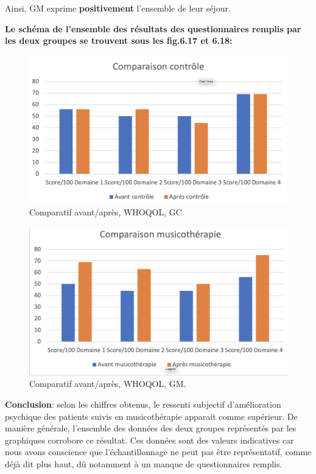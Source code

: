                  Ainsi,  GM exprime
                 \textbf{positivement }
                 l'ensemble de leur séjour.

               \textbf{ Le schéma de l'ensemble des résultats des
                 questionnaires remplis par les deux groupes se trouvent sous les fig.6.17 et 6.18:}
                
\begin{figure}
\centering
\includegraphics[width=0.7\linewidth]{images/Compcontrole.png}
\caption[Schéma du déroulement]{Comparatif avant/après, 
  WHOQOL, GC}
       
\label{groupecontroleimage1}
\end{figure}

\begin{figure}
\centering
\includegraphics[width=0.7\linewidth]{images/Compmusico.png}
\caption[Schéma du déroulement]{Comparatif  avant/après, WHOQOL, GM.}
       
\label{groupecontroleimage1}
\end{figure}



       \textbf{ Conclusion}: selon les chiffres obtenus, le ressenti
       subjectif d'amélioration psychique 
        des patients suivis en musicothérapie apparait comme
        supérieur.
        De manière générale, l'ensemble des données des deux groupes représentés
        par les graphiques corrobore ce résultat.
        Ces données sont des valeurs indicatives car nous avons conscience que l'échantillonnage ne
        peut pas être représentatif, comme déjà dit plus haut, dû
        notamment à un
        manque de
        questionnaires remplis.
